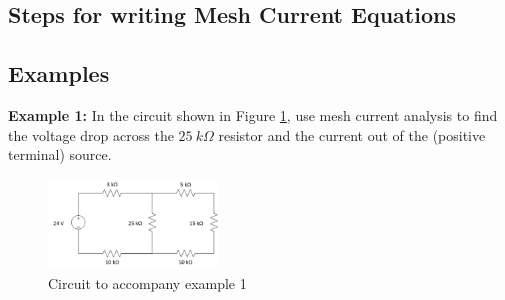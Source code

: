\documentclass{handout}
\begin{document}
\subsection{Steps for writing Mesh Current Equations}

\subsection{Examples}
\textbf{Example 1:} In the circuit shown in Figure \ref{fig: MeshAnalysisEx1}, use mesh current analysis to find the voltage drop across the $25\ k\Omega$ resistor and the current out of the (positive terminal) source.

\begin{figure} [h t b]
\centering
\includegraphics[width=0.4\textwidth]{MeshAnalysisEx1.jpg}
\caption{Circuit to accompany example 1}
\label{fig: MeshAnalysisEx1}
\end{figure}
\end{document}
